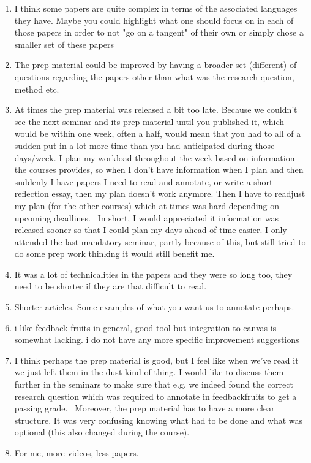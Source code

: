 \documentclass[a4paper]{report}
\begin{document}
\begin{enumerate}
  \item I think some papers are quite complex in terms of the associated languages they have. Maybe you could highlight what one should focus on in each of those papers in order to not "go on a tangent" of their own or simply chose a smaller set of these papers
  \item The prep material could be improved by having a broader set (different) of questions regarding the papers other than what was the research question, method etc.
  \item At times the prep material was released a bit too late. Because we couldn't see the next seminar and its prep material until you published it, which would be within one week, often a half, would mean that you had to all of a sudden put in a lot more time than you had anticipated during those days/week. I plan my workload throughout the week based on information the courses provides, so when I don't have information when I plan and then suddenly I have papers I need to read and annotate, or write a short reflection essay, then my plan doesn't work anymore. Then I have to readjust my plan (for the other courses) which at times was hard depending on upcoming deadlines.   In short, I would appreciated it information was released sooner so that I could plan my days ahead of time easier. I only attended the last mandatory seminar, partly because of this, but still tried to do some prep work thinking it would still benefit me.
  \item It was a lot of technicalities in the papers and they were so long too, they need to be shorter if they are that difficult to read.
  \item Shorter articles. Some examples of what you want us to annotate perhaps.
  \item i like feedback fruits in general, good tool but integration to canvas is somewhat lacking. i do not have any more specific improvement suggestions
  \item I think perhaps the prep material is good, but I feel like when we've read it we just left them in the dust kind of thing. I would like to discuss them further in the seminars to make sure that e.g. we indeed found the correct research question which was required to annotate in feedbackfruits to get a passing grade.   Moreover, the prep material has to have a more clear structure. It was very confusing knowing what had to be done and what was optional (this also changed during the course).
  \item For me, more videos, less papers.
\end{enumerate}
\end{document}
